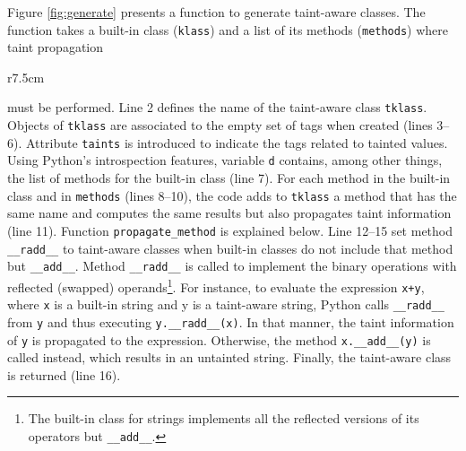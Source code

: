 \documentclass[oribibl]{llncs}
\newcommand{\nametklass}{taint-aware }
\begin{document}
Figure \ref{fig:generate} presents a function to generate
\nametklass classes. The function takes a built-in
class (\texttt{klass}) and a list of its methods
(\texttt{methods}) where taint propagation 
\begin{wrapfigure}{r}{7.5cm}
\vspace{-20pt}
{\small{

\caption{\label{fig:propagate} Propagation of taint information}
}}
\vspace{-15pt}
\end{wrapfigure}
must be performed. 
Line 2 defines the name of the \nametklass class \texttt{tklass}.
Objects of \texttt{tklass}  
are associated to the empty set
 of tags when created (lines 3--6). Attribute 
\texttt{taints} is introduced to 
indicate the tags related to tainted values.
Using Python's introspection features, variable 
\texttt{d} contains, among other
things, the list of methods for the built-in class (line 7). 
For each method in the built-in class and in \texttt{methods} 
(lines 8--10), the code adds to \texttt{tklass} a 
method that has the same name and computes the same results 
but also propagates taint information  
(line 11).
Function \texttt{propagate\_method} is explained below.
Line 12--15 set method \texttt{\_\_radd\_\_} to taint-aware 
classes when built-in classes do not include that method but 
\texttt{\_\_add\_\_}.
Method \texttt{\_\_radd\_\_} is called to implement the binary operations 
with reflected (swapped) operands\footnote{The built-in class 
   for strings implements all 
   the reflected versions of its operators but \texttt{\_\_add\_\_}.}. 
For instance, to evaluate the expression \texttt{x+y}, where \texttt{x} is a built-in string 
and y is a taint-aware string, Python calls \texttt{\_\_radd\_\_} from 
\texttt{y} and thus executing \texttt{y.\_\_radd\_\_(x)}. In that manner, 
the taint information of \texttt{y} is propagated to the expression. Otherwise, the method
\texttt{x.\_\_add\_\_(y)} is called instead, 
which results in an untainted string.
Finally, the \nametklass class is returned (line 16). 
\end{document}
